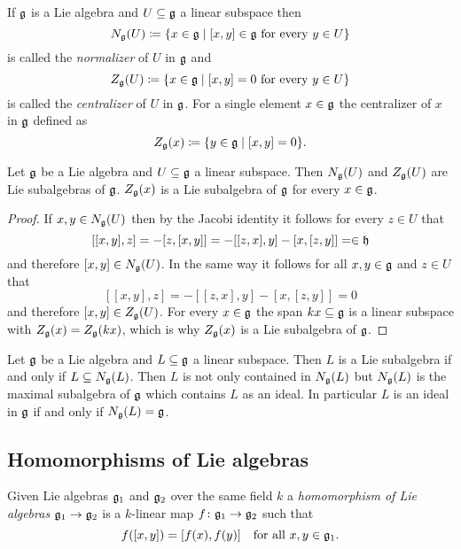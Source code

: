 \begin{defi}
 If $\mathfrak{g}$ is a Lie algebra and $U \subseteq \mathfrak{g}$ a linear subspace then
 \[
  N_{\mathfrak{g}}(U) \coloneqq \{x \in \mathfrak{g} \mid \text{$[x,y] \in \mathfrak{g}$ for every $y \in U$}\}
 \]
 is called the \emph{normalizer} of $U$ in $\mathfrak{g}$ and
 \[
  Z_{\mathfrak{g}}(U) \coloneqq \{x \in \mathfrak{g} \mid \text{$[x,y] = 0$ for every $y \in U$}\}
 \]
 is called the \emph{centralizer} of $U$ in $\mathfrak{g}$. For a single element $x \in \mathfrak{g}$ the centralizer of $x$ in $\mathfrak{g}$ defined as
 \[
  Z_{\mathfrak{g}}(x) \coloneqq \{y \in \mathfrak{g} \mid [x,y] = 0\}.
 \]
\end{defi}


\begin{lem}
 Let $\mathfrak{g}$ be a Lie algebra and $U \subseteq \mathfrak{g}$ a linear subspace. Then $N_{\mathfrak{g}}(U)$ and $Z_{\mathfrak{g}}(U)$ are Lie subalgebras of $\mathfrak{g}$. $Z_{\mathfrak{g}}(x)$ is a Lie subalgebra of $\mathfrak{g}$ for every $x \in \mathfrak{g}$.
\end{lem}
\begin{proof}
 If $x,y \in N_{\mathfrak{g}}(U)$ then by the Jacobi identity it follows for every $z \in U$ that
 \[
  [[x,y],z]
  = -[z,[x,y]]
  = -[[z,x],y]-[x,[z,y]]
  = \in \mathfrak{h}
 \]
 and therefore $[x,y] \in N_{\mathfrak{g}}(U)$. In the same way it follows for all $x,y \in \mathfrak{g}$ and $z \in U$ that
 \[
  [[x,y],z]
  = -[[z,x],y]-[x,[z,y]]
  = 0
 \]
 and therefore $[x,y] \in Z_{\mathfrak{g}}(U)$. For every $x \in \mathfrak{g}$ the span $kx \subseteq \mathfrak{g}$ is a linear subspace with $Z_{\mathfrak{g}}(x) = Z_{\mathfrak{g}}(kx)$, which is why $Z_{\mathfrak{g}}(x)$ is a Lie subalgebra of $\mathfrak{g}$.
\end{proof}


\begin{rem}
 Let $\mathfrak{g}$ be a Lie algebra and $L \subseteq \mathfrak{g}$ a linear subspace. Then $L$ is a Lie subalgebra if and only if $L \subseteq N_{\mathfrak{g}}(L)$. Then $L$ is not only contained in $N_{\mathfrak{g}}(L)$ but $N_{\mathfrak{g}}(L)$ is the maximal subalgebra of $\mathfrak{g}$ which contains $L$ as an ideal. In particular $L$ is an ideal in $\mathfrak{g}$ if and only if $N_{\mathfrak{g}}(L) = \mathfrak{g}$.
\end{rem}









\subsection{Homomorphisms of Lie algebras}


\begin{defi}
 Given Lie algebras $\mathfrak{g}_1$ and $\mathfrak{g}_2$ over the same field $k$ a \emph{homomorphism of Lie algebras} $\mathfrak{g}_1 \to \mathfrak{g}_2$ is a $k$-linear map $f \colon \mathfrak{g}_1 \to \mathfrak{g}_2$ such that
 \[
  f([x,y]) =[f(x),f(y)] \quad \text{for all $x,y \in \mathfrak{g}_1$}.
 \]
\end{defi}



